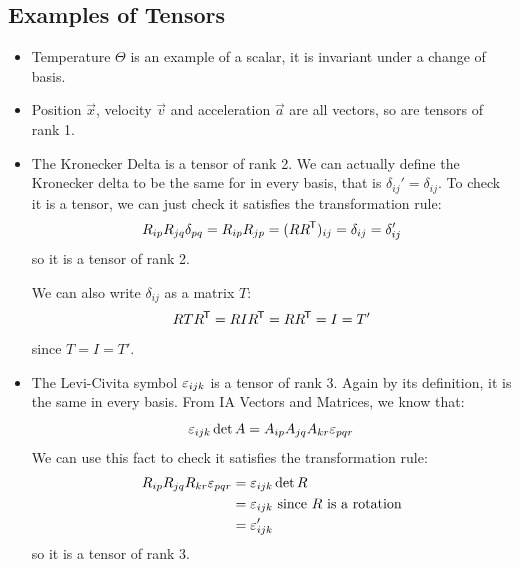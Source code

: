 \documentclass[../main.tex]{subfiles}
\begin{document}
\subsection{Examples of Tensors}
\begin{itemize}
  \item Temperature $\Theta$ is an example of a scalar, it is invariant under a change of basis.
  \item Position $\vec{x}$, velocity $\vec{v}$ and acceleration $\vec{a}$ are all vectors, so are tensors of rank 1.
  \item The Kronecker Delta is a tensor of rank 2. We can actually define the Kronecker delta to be the same for in every basis, that is $\delta_{i j}' = \delta_{i j}$.
    To check it is a tensor, we can just check it satisfies the transformation rule:
    \[
      R_{i p}R_{j q}\delta_{p q} = R_{i p}R_{j p} = (R R^{{\mkern-1.5mu\mathsf{T}}})_{i j} = \delta_{i j} = \delta_{i j}'
    \]
    so it is a tensor of rank 2.

    We can also write $\delta_{i j}$ as a matrix $T$:
    \[
      RTR^{{\mkern-1.5mu\mathsf{T}}} = RIR^{{\mkern-1.5mu\mathsf{T}}} = R R^{{\mkern-1.5mu\mathsf{T}}} = I = T'
    \]
    since $T = I = T'$.
  \item The Levi-Civita symbol $\varepsilon_{i j k}$ is a tensor of rank 3.
    Again by its definition, it is the same in every basis.
    From IA Vectors and Matrices, we know that:
    \[
      \varepsilon_{i j k}\det A = A_{i p}A_{j q}A_{k r}\varepsilon_{p q r}
    \]
    We can use this fact to check it satisfies the transformation rule:
    \begin{align*}
      R_{i p}R_{j q}R_{k r}\varepsilon_{p q r} &= \varepsilon_{i j k}\det R \\
                                         &= \varepsilon_{i j k} \text{ since $R$ is a rotation} \\
                                         &= \varepsilon_{i j k}'
    \end{align*}
    so it is a tensor of rank 3.
\end{itemize}
\end{document}
